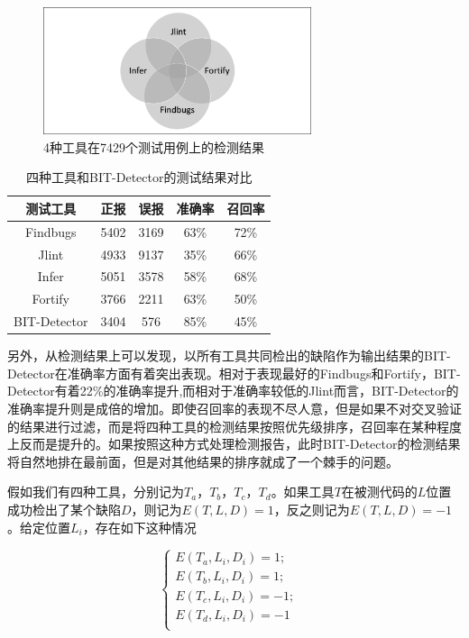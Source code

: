 \begin{figure}
	\centering
	\includegraphics[width=0.70\textwidth]{figures/vnfigure3-1}
	\caption{4种工具在7429个测试用例上的检测结果}\label{fig:figure3-1}
\end{figure}

\begin{table}
	\centering
	\caption{四种工具和BIT-Detector的测试结果对比} \label{tab:table3-1}
	\begin{tabular*}{0.9\textwidth}{@{\extracolsep{\fill}}ccccc}
		\toprule
		测试工具	&正报	&误报	&准确率	&召回率 \\
		\midrule
		Findbugs	&5402	&3169	&63\%	&72\% \\
		Jlint	&4933	&9137	&35\%	&66\% \\
		Infer	&5051	&3578	&58\%	&68\% \\
		Fortify	&3766	&2211	&63\%	&50\% \\
		BIT-Detector	&3404	&576	&85\%	&45\% \\
		\bottomrule
	\end{tabular*}
\end{table}

另外，从检测结果上可以发现，以所有工具共同检出的缺陷作为输出结果的BIT-Detector在准确率方面有着突出表现。相对于表现最好的Findbugs和Fortify，BIT-Detector有着22\%的准确率提升,而相对于准确率较低的Jlint而言，BIT-Detector的准确率提升则是成倍的增加。即使召回率的表现不尽人意，但是如果不对交叉验证的结果进行过滤，而是将四种工具的检测结果按照优先级排序，召回率在某种程度上反而是提升的。如果按照这种方式处理检测报告，此时BIT-Detector的检测结果将自然地排在最前面，但是对其他结果的排序就成了一个棘手的问题。

假如我们有四种工具，分别记为$T_a$，$T_b$，$T_c$，$T_d$。如果工具$T$在被测代码的$L$位置成功检出了某个缺陷$D$，则记为$E(T,L,D)=1$，反之则记为$E(T,L,D)=-1$。给定位置$L_i$，存在如下这种情况

\begin{equation*}  
	\left\{  
	\begin{array}{lr}  
	E(T_{a},L_{i},D_i)=1; &  \\  
	E(T_{b},L_{i},D_i)=1; &  \\  
	E(T_{c},L_{i},D_i)=-1; &  \\  
	E(T_{d},L_{i},D_i)=-1&  \\  
	\end{array}  
	\right.  
\end{equation*} 

